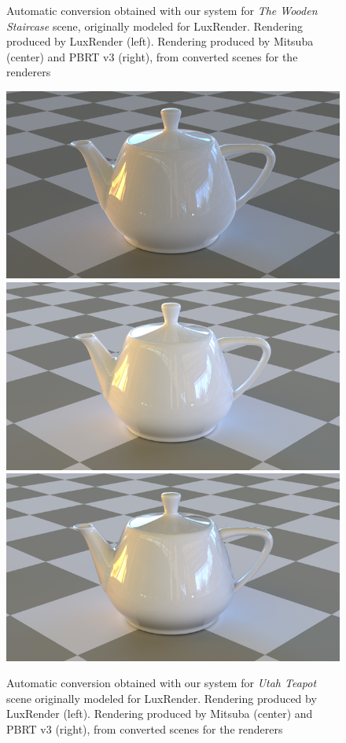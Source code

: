 \begin{figure}
\caption{Automatic conversion obtained with our system for \textit{The Wooden Staircase}
scene, originally modeled for LuxRender. Rendering produced by LuxRender (left).
Rendering produced by Mitsuba (center) and PBRT v3 (right),
from converted scenes for the renderers}
\label{fig:staircase}
\end{figure}

\begin{figure}
\centering
\includegraphics[width=0.32\linewidth]{figs/4_results/teapot/1_from_lux.png}
\includegraphics[width=0.32\linewidth]{figs/4_results/teapot/2_to_mitsuba.png}
\includegraphics[width=0.32\linewidth]{figs/4_results/teapot/3_to_pbrt.png}
\caption{Automatic conversion obtained with our system for \textit{Utah Teapot}
scene originally modeled for LuxRender. Rendering produced by LuxRender (left).
Rendering produced by Mitsuba (center) and PBRT v3 (right),
from converted scenes for the renderers}
\label{fig:teapot}
\end{figure}

